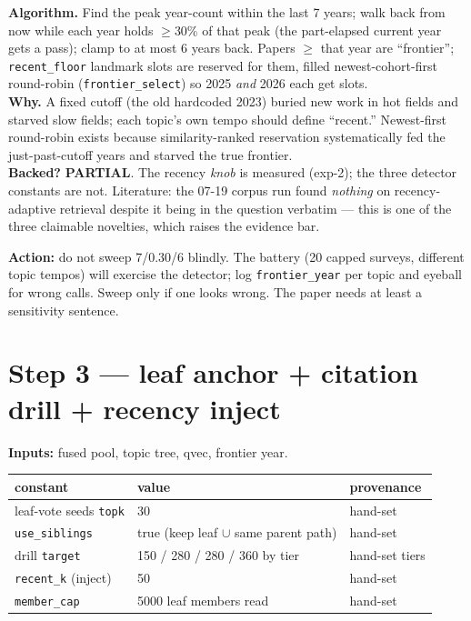 \documentclass[10pt]{article}
\newenvironment{varbox}
  {\par\medskip\begin{lrbox}{\varboxsave}%
   \begin{minipage}{\dimexpr\linewidth-2\fboxsep\relax}\small\vspace{4pt}}
  {\vspace{4pt}\end{minipage}\end{lrbox}%
   \noindent\colorbox{boxbg}{\usebox{\varboxsave}}\par\medskip}
\newcommand{\backedpart}{\textcolor{orange!80!black}{\textbf{PARTIAL}}}
\newcommand{\act}[1]{\par\smallskip\noindent\textbf{Action:} #1}
\begin{document}
\textbf{Algorithm.} Find the peak year-count within the last 7 years; walk back from now
while each year holds $\geq$30\% of that peak (the part-elapsed current year gets a pass);
clamp to at most 6 years back. Papers $\geq$ that year are ``frontier''; \texttt{recent\_floor}
landmark slots are reserved for them, filled newest-cohort-first round-robin
(\texttt{frontier\_select}) so 2025 \emph{and} 2026 each get slots. \\
\textbf{Why.} A fixed cutoff (the old hardcoded 2023) buried new work in hot fields and
starved slow fields; each topic's own tempo should define ``recent.'' Newest-first
round-robin exists because similarity-ranked reservation systematically fed the
just-past-cutoff years and starved the true frontier. \\
\textbf{Backed?} \backedpart. The recency \emph{knob} is measured (exp-2); the three
detector constants are not. Literature: the 07-19 corpus run found \emph{nothing} on
recency-adaptive retrieval despite it being in the question verbatim --- this is one of the
three claimable novelties, which raises the evidence bar. \\
\act{do not sweep 7/0.30/6 blindly. The battery (20 capped surveys, different topic tempos)
will exercise the detector; log \texttt{frontier\_year} per topic and eyeball for wrong
calls. Sweep only if one looks wrong. The paper needs at least a sensitivity sentence.}

\section{Step 3 --- leaf anchor + citation drill + recency inject}
\textbf{Inputs:} fused pool, topic tree, qvec, frontier year.

\begin{varbox}
\begin{tabular}{@{}lll@{}}
\toprule
constant & value & provenance \\
\midrule
leaf-vote seeds \texttt{topk} & 30 & hand-set \\
\texttt{use\_siblings} & true (keep leaf $\cup$ same parent path) & hand-set \\
drill \texttt{target} & 150 / 280 / 280 / 360 by tier & hand-set tiers \\
\texttt{recent\_k} (inject) & 50 & hand-set \\
\texttt{member\_cap} & 5000 leaf members read & hand-set \\
\bottomrule
\end{tabular}
\end{varbox}
\end{document}
